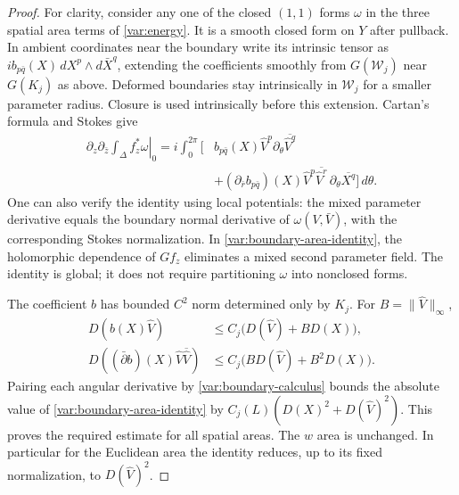 \documentclass[11pt]{article}
\theoremstyle{definition}
\theoremstyle{remark}
\numberwithin{equation}{section}
\begin{document}
\begin{proof}
For clarity, consider any one of the closed $(1,1)$ forms $\omega$ in
the three spatial area terms of \eqref{var:energy}.  It is a smooth
closed form on $Y$ after pullback.  In ambient coordinates near the
boundary write its intrinsic tensor as
$i b_{p\bar q}(X)\,dX^p\wedge d\bar X^q$, extending the coefficients
smoothly from $G(\mathcal W_j)$ near $G(K_j)$ as above.  Deformed
boundaries stay intrinsically in $\mathcal W_j$ for a smaller parameter
radius.  Closure is used intrinsically
before this extension.  Cartan's formula and Stokes give
\begin{equation}
 \begin{split}
 \left.\partial_z\partial_{\bar z}
       \int_\Delta f_z^*\omega\right|_0
 =i\int_0^{2\pi}\bigl[&
 b_{p\bar q}(X)\widehat V^p\partial_\theta
                         \overline{\widehat V^q}\\
 &+(\partial_{\bar r}b_{p\bar q})(X)
 \widehat V^p\overline{\widehat V^r}\,
                         \partial_\theta\overline{X^q}\bigr]\,d\theta.
 \end{split}
 \label{var:boundary-area-identity}
\end{equation}
One can also verify the identity using local potentials: the mixed
parameter derivative equals the boundary normal derivative of
$\omega(V,\bar V)$, with the corresponding Stokes normalization.
In \eqref{var:boundary-area-identity}, the holomorphic dependence of
$Gf_z$ eliminates a mixed second parameter field.  The identity is
global; it does not require partitioning $\omega$ into nonclosed forms.

The coefficient $b$ has bounded $C^2$ norm determined only by $K_j$.
For $B=\|\widehat V\|_\infty$,
\[
 \begin{split}
 D(b(X)\widehat V)&\le C_j\bigl(D(\widehat V)+B D(X)\bigr),\\
 D((\bar\partial b)(X)\widehat V\overline{\widehat V})
 &\le C_j\bigl(BD(\widehat V)+B^2D(X)\bigr).
 \end{split}
\]
Pairing each angular derivative by \eqref{var:boundary-calculus}
bounds the absolute value of \eqref{var:boundary-area-identity} by
$C_j(L)(D(X)^2+D(\widehat V)^2)$.  This proves the required estimate
for all spatial areas.  The $w$ area is unchanged.  In particular for
the Euclidean area the identity reduces, up to its fixed normalization,
to $D(\widehat V)^2$.


\end{proof}
\end{document}
